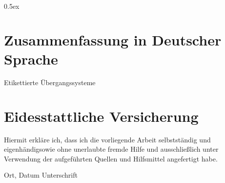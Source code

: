 \documentclass[11pt,a4paper,openany]{book}
\begin{document}
\newpage\null\thispagestyle{empty}\newpage

\tableofcontents
\newpage\null\thispagestyle{empty}\newpage


\parindent 0pt\parskip 0.5ex
















{


}

\appendix




\newpage\null\thispagestyle{empty}\newpage

\chapter*{Zusammenfassung in Deutscher Sprache}

Etikettierte Übergangssysteme


\thispagestyle{empty}
\newpage\null\thispagestyle{empty}\newpage

\chapter*{Eidesstattliche Versicherung}

Hiermit erkläre ich, dass ich die vorliegende Arbeit selbstständig und eigenhändigsowie ohne unerlaubte fremde Hilfe und ausschließlich unter Verwendung der aufgeführten Quellen und Hilfsmittel angefertigt habe.

\vspace{4cm}

\hspace{2cm} Ort, Datum \hfill Unterschrift \hspace{2cm}


\thispagestyle{empty}
\end{document}

